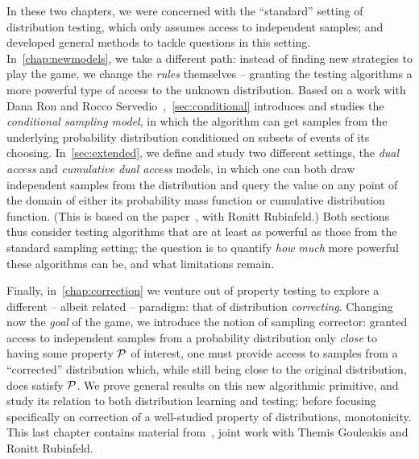 In these two chapters, we were concerned with the ``standard'' setting of distribution testing, which only assumes access to independent samples; and developed general methods to tackle questions in this setting. In~\cref{chap:newmodels}, we take a different path: instead of finding new strategies to play the game, we change the \emph{rules} themselves -- granting the testing algorithms a more powerful type of access to the unknown distribution. Based on a work with Dana Ron and Rocco Servedio~\cite{CRS:15},~\cref{sec:conditional} introduces and studies the \emph{conditional sampling model}, in which the algorithm can get samples from the underlying probability distribution conditioned on subsets of events of its choosing. In~\cref{sec:extended}, we define and study two different settings, the \emph{dual access} and \emph{cumulative dual access} models, in which one can both draw independent samples from the distribution and query the value on any point of the domain of either its probability mass function or cumulative distribution function. (This is based on the paper~\cite{CR:14}, with Ronitt Rubinfeld.) Both sections thus consider testing algorithms that are at least as powerful as those from the standard sampling setting; the question is to quantify \emph{how much} more powerful these algorithms can be, and what limitations remain.

Finally, in~\cref{chap:correction} we venture out of property testing to explore a different -- albeit related -- paradigm: that of distribution \emph{correcting}. Changing now the \emph{goal} of the game, we introduce the notion of sampling corrector: granted access to independent samples from a probability distribution only \emph{close} to having some property $\mathcal{P}$ of interest, one must provide access to samples from a ``corrected'' distribution which, while still being close to the original distribution, does satisfy $\mathcal{P}$. We prove general results on this new algorithmic primitive, and study its relation to both distribution learning and testing; before focusing specifically on correction of a well-studied property of distributions, monotonicity. This last chapter contains material from~\cite{CGR:16}, joint work with Themis Gouleakis and Ronitt Rubinfeld.
